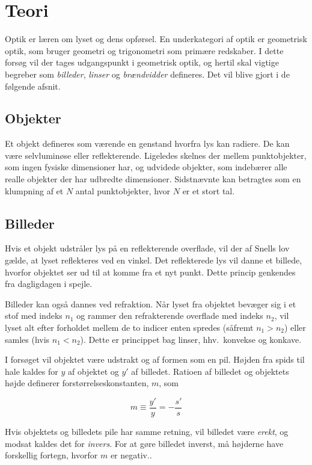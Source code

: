 \section{Teori}
Optik er læren om lyset og dens opførsel. En underkategori af optik er geometrisk optik, som bruger geometri og trigonometri som primære redskaber. I dette forsøg vil der tages udgangspunkt i geometrisk optik, og hertil skal vigtige begreber som \emph{billeder}, \emph{linser} og \emph{brændvidder} defineres. Det vil blive gjort i de følgende afsnit.

\subsection{Objekter}
Et objekt defineres som værende en genstand hvorfra lys kan radiere. De kan være selvluminøse eller reflekterende. Ligeledes skelnes der mellem punktobjekter, som ingen fysiske dimensioner har, og udvidede objekter, som indebærer alle realle objekter der har udbredte dimensioner. Sidstnævnte kan betragtes som en klumpning af et $N$ antal punktobjekter, hvor $N$ er et stort tal.


\subsection{Billeder}
Hvis et objekt udstråler lys på en reflekterende overflade, vil der af Snells lov gælde, at lyset reflekteres ved en vinkel. Det reflekterede lys vil danne et billede, hvorfor objektet ser ud til at komme fra et nyt punkt. Dette princip genkendes fra dagligdagen i spejle.

Billeder kan også dannes ved refraktion. Når lyset fra objektet bevæger sig i et stof med indeks $n_1$ og rammer den refrakterende overflade med indeks $n_2$, vil lyset alt efter forholdet mellem de to indicer enten spredes (såfremt $n_1 > n_2$) eller samles (hvis $n_1 < n_2$). Dette er princippet bag linser, hhv.\ konvekse og konkave.


I forsøget vil objektet være udstrakt og af formen som en pil. Højden fra spids til hale kaldes for $y$ af objektet og $y'$ af billedet. Ratioen af billedet og objektets højde definerer forstørrelseskonstanten, $m$, som

\begin{equation}
    m \equiv \frac{y'}{y} = -\frac{s'}{s}
    \label{eq:m}
\end{equation}

Hvis objektets og billedets pile har samme retning, vil billedet være \emph{erekt}, og modsat kaldes det for \emph{invers}. For at gøre billedet inverst, må højderne have forskellig fortegn, hvorfor $m$ er negativ..

